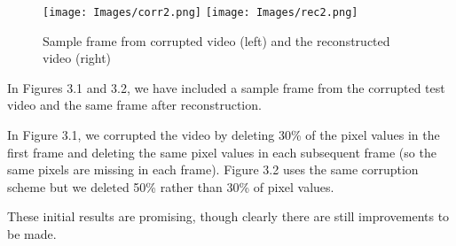 \begin{figure}
\label{fig:soccer}
\center
\texttt{[image: Images/corr2.png]}
\texttt{[image: Images/rec2.png]}
\caption{Sample frame from corrupted video (left) and the reconstructed video (right)}
\end{figure}

In Figures 3.1 and 3.2, we have included a sample frame from the corrupted test video and the same frame after reconstruction.

In Figure 3.1, we corrupted the video by deleting 30\% of the pixel values in the first frame and deleting the same pixel values in each subsequent frame (so the same pixels are missing in each frame).
Figure 3.2 uses the same corruption scheme but we deleted 50\% rather than 30\% of pixel values.

These initial results are promising, though clearly there are still improvements to be made.


